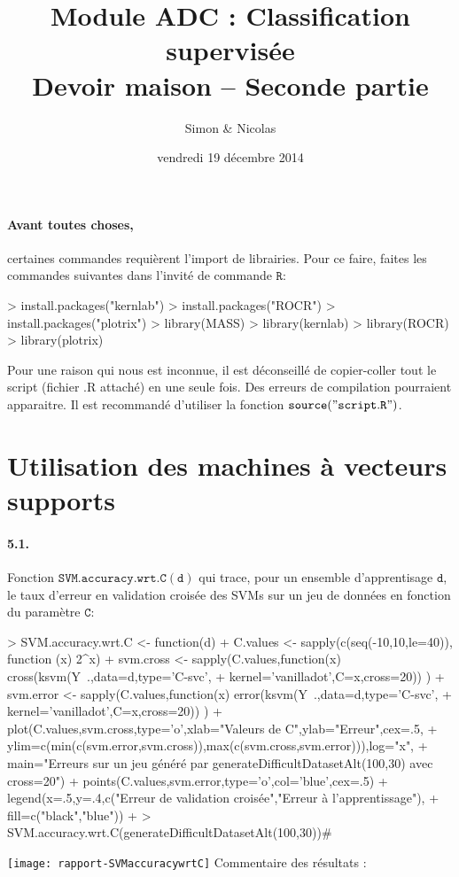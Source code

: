 \documentclass{article}
\title{Module ADC : Classification supervisée \\ Devoir maison -- Seconde partie}
\date{vendredi 19 décembre 2014}
\author{Simon \bsc{Besson-Girard} & Nicolas \bsc{Wattiez}}
\begin{document}
\maketitle

\paragraph{Avant toutes choses,} certaines commandes requièrent 
l'import de librairies. Pour ce 
faire, faites les commandes suivantes dans l'invité de commande 
$\mathtt{R}$:
\begin{Schunk}
\begin{Sinput}
> install.packages("kernlab")
> install.packages("ROCR")
> install.packages("plotrix")
> library(MASS)
> library(kernlab)
> library(ROCR)
> library(plotrix)
\end{Sinput}
\end{Schunk}

Pour une raison qui nous est inconnue, il est déconseillé de 
copier-coller tout le script (fichier .R attaché) en une seule fois. Des
 erreurs de compilation pourraient apparaitre. Il est recommandé 
 d'utiliser la fonction $\mathtt{source("script.R")}$.
 
\section{Utilisation des machines à vecteurs supports}
\paragraph{5.1.}Fonction $\mathtt{SVM.accuracy.wrt.C(d)}$ qui trace, 
pour un ensemble d'apprentisage $\mathtt{d}$, le taux d'erreur en 
validation croisée des SVMs sur un jeu de données en fonction du 
paramètre $\mathtt{C}$:
\begin{Schunk}
\begin{Sinput}
> SVM.accuracy.wrt.C <- function(d) {
+ 	C.values <- sapply(c(seq(-10,10,le=40)), function (x) 2^x)
+ 	svm.cross <- sapply(C.values,function(x) cross(ksvm(Y~.,data=d,type='C-svc',
+ 			kernel='vanilladot',C=x,cross=20)) )
+ 	svm.error <- sapply(C.values,function(x) error(ksvm(Y~.,data=d,type='C-svc',
+ 			kernel='vanilladot',C=x,cross=20)) ) 
+ 	plot(C.values,svm.cross,type='o',xlab="Valeurs de C",ylab="Erreur",cex=.5,
+ 			ylim=c(min(c(svm.error,svm.cross)),max(c(svm.cross,svm.error))),log="x",
+ 			main="Erreurs sur un jeu généré par \n generateDifficultDatasetAlt(100,30) avec cross=20")
+ 	points(C.values,svm.error,type='o',col='blue',cex=.5)
+ 	legend(x=.5,y=.4,c("Erreur de validation croisée","Erreur à l'apprentissage"),
+ 			fill=c("black","blue"))
+ }
> SVM.accuracy.wrt.C(generateDifficultDatasetAlt(100,30))#
\end{Sinput}
\end{Schunk}
\texttt{[image: rapport-SVMaccuracywrtC]}
\newline
Commentaire des résultats :
\end{document}
